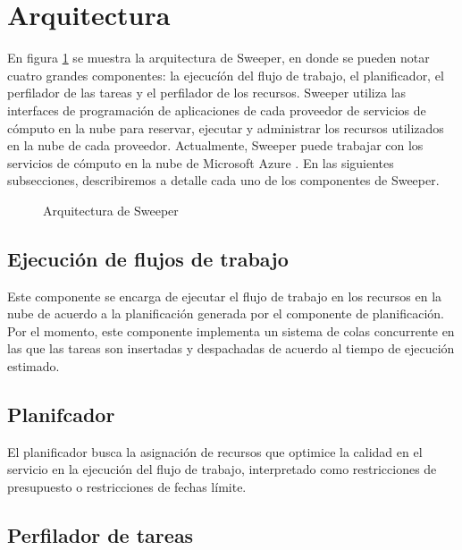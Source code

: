 \section{Arquitectura}

En figura \ref{fig:sweeper-arch} se muestra la arquitectura de Sweeper, en donde se pueden notar cuatro grandes componentes: la ejecucíón del flujo de trabajo, el planificador, el perfilador de las tareas y el perfilador de los recursos. Sweeper utiliza las interfaces de programación de aplicaciones de cada proveedor de servicios de cómputo en la nube para reservar, ejecutar y administrar los recursos utilizados en la nube de cada proveedor. Actualmente, Sweeper puede trabajar con los servicios de cómputo en la nube de Microsoft Azure \cite{microsoft2015azure}. En las siguientes subsecciones, describiremos a detalle cada uno de los componentes de Sweeper.

\begin{figure}
\begin{center}
\end{center}
\caption{Arquitectura de Sweeper}
\label{fig:sweeper-arch}
\end{figure}


\subsection{Ejecución de flujos de trabajo}

Este componente se encarga de ejecutar el flujo de trabajo en los recursos en la nube de acuerdo a la planificación generada por el componente de planificación. Por el momento, este componente implementa un sistema de colas concurrente en las que las tareas son insertadas y despachadas de acuerdo al tiempo de ejecución estimado.



\subsection{Planifcador}

El planificador busca la asignación de recursos que optimice la calidad en el servicio en la ejecución del flujo de trabajo, interpretado como restricciones de presupuesto o restricciones de fechas límite. 



\subsection{Perfilador de tareas}

